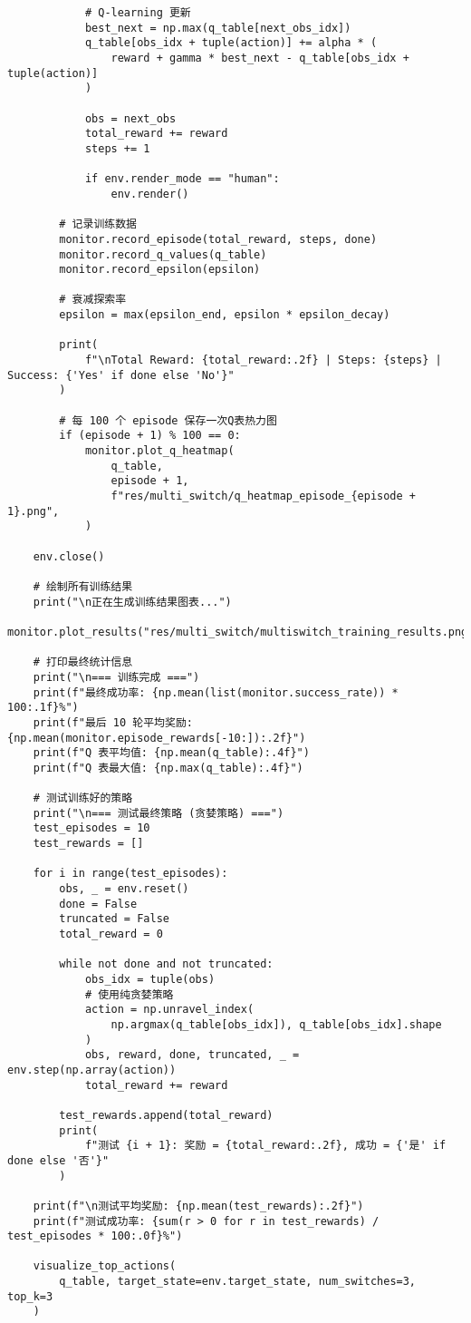 \begin{verbatim}
            # Q-learning 更新
            best_next = np.max(q_table[next_obs_idx])
            q_table[obs_idx + tuple(action)] += alpha * (
                reward + gamma * best_next - q_table[obs_idx + tuple(action)]
            )

            obs = next_obs
            total_reward += reward
            steps += 1

            if env.render_mode == "human":
                env.render()

        # 记录训练数据
        monitor.record_episode(total_reward, steps, done)
        monitor.record_q_values(q_table)
        monitor.record_epsilon(epsilon)

        # 衰减探索率
        epsilon = max(epsilon_end, epsilon * epsilon_decay)

        print(
            f"\nTotal Reward: {total_reward:.2f} | Steps: {steps} | Success: {'Yes' if done else 'No'}"
        )

        # 每 100 个 episode 保存一次Q表热力图
        if (episode + 1) % 100 == 0:
            monitor.plot_q_heatmap(
                q_table,
                episode + 1,
                f"res/multi_switch/q_heatmap_episode_{episode + 1}.png",
            )

    env.close()

    # 绘制所有训练结果
    print("\n正在生成训练结果图表...")
    monitor.plot_results("res/multi_switch/multiswitch_training_results.png")

    # 打印最终统计信息
    print("\n=== 训练完成 ===")
    print(f"最终成功率: {np.mean(list(monitor.success_rate)) * 100:.1f}%")
    print(f"最后 10 轮平均奖励: {np.mean(monitor.episode_rewards[-10:]):.2f}")
    print(f"Q 表平均值: {np.mean(q_table):.4f}")
    print(f"Q 表最大值: {np.max(q_table):.4f}")

    # 测试训练好的策略
    print("\n=== 测试最终策略 (贪婪策略) ===")
    test_episodes = 10
    test_rewards = []

    for i in range(test_episodes):
        obs, _ = env.reset()
        done = False
        truncated = False
        total_reward = 0

        while not done and not truncated:
            obs_idx = tuple(obs)
            # 使用纯贪婪策略
            action = np.unravel_index(
                np.argmax(q_table[obs_idx]), q_table[obs_idx].shape
            )
            obs, reward, done, truncated, _ = env.step(np.array(action))
            total_reward += reward

        test_rewards.append(total_reward)
        print(
            f"测试 {i + 1}: 奖励 = {total_reward:.2f}, 成功 = {'是' if done else '否'}"
        )

    print(f"\n测试平均奖励: {np.mean(test_rewards):.2f}")
    print(f"测试成功率: {sum(r > 0 for r in test_rewards) / test_episodes * 100:.0f}%")

    visualize_top_actions(
        q_table, target_state=env.target_state, num_switches=3, top_k=3
    )

\end{verbatim}